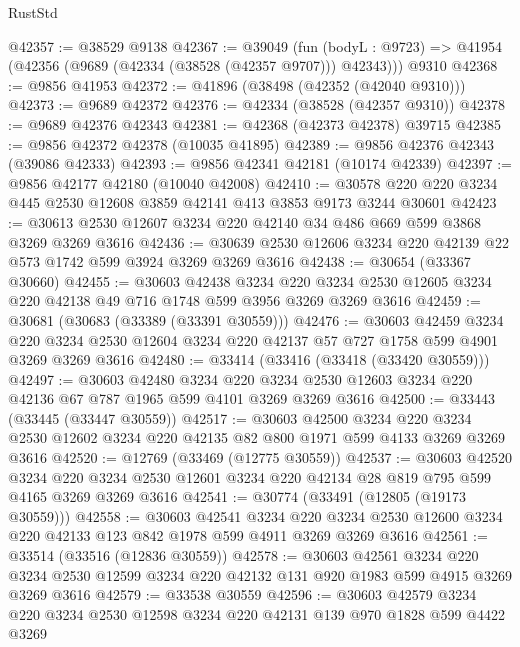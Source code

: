 \begin{lexlean}{RustStd}
\begin{coremodule}
@42357 := @38529 @9138
@42367 := @39049
    (fun (bodyL : @9723) => @41954 (@42356 (@9689 (@42334 (@38528 (@42357 @9707))) @42343)))
    @9310
@42368 := @9856 @41953
@42372 := @41896 (@38498 (@42352 (@42040 @9310)))
@42373 := @9689 @42372
@42376 := @42334 (@38528 (@42357 @9310))
@42378 := @9689 @42376 @42343
@42381 := @42368 (@42373 @42378) @39715
@42385 := @9856 @42372 @42378 (@10035 @41895)
@42389 := @9856 @42376 @42343 (@39086 @42333)
@42393 := @9856 @42341 @42181 (@10174 @42339)
@42397 := @9856 @42177 @42180 (@10040 @42008)
@42410 := @30578 @220 @220 @3234 @445 @2530 @12608 @3859 @42141 @413 @3853 @9173 @3244 @30601
@42423 := @30613 @2530 @12607 @3234 @220 @42140 @34 @486 @669 @599 @3868 @3269 @3269 @3616
@42436 := @30639 @2530 @12606 @3234 @220 @42139 @22 @573 @1742 @599 @3924 @3269 @3269 @3616
@42438 := @30654 (@33367 @30660)
@42455 := @30603
    @42438
    @3234
    @220
    @3234
    @2530
    @12605
    @3234
    @220
    @42138
    @49
    @716
    @1748
    @599
    @3956
    @3269
    @3269
    @3616
@42459 := @30681 (@30683 (@33389 (@33391 @30559)))
@42476 := @30603
    @42459
    @3234
    @220
    @3234
    @2530
    @12604
    @3234
    @220
    @42137
    @57
    @727
    @1758
    @599
    @4901
    @3269
    @3269
    @3616
@42480 := @33414 (@33416 (@33418 (@33420 @30559)))
@42497 := @30603
    @42480
    @3234
    @220
    @3234
    @2530
    @12603
    @3234
    @220
    @42136
    @67
    @787
    @1965
    @599
    @4101
    @3269
    @3269
    @3616
@42500 := @33443 (@33445 (@33447 @30559))
@42517 := @30603
    @42500
    @3234
    @220
    @3234
    @2530
    @12602
    @3234
    @220
    @42135
    @82
    @800
    @1971
    @599
    @4133
    @3269
    @3269
    @3616
@42520 := @12769 (@33469 (@12775 @30559))
@42537 := @30603
    @42520
    @3234
    @220
    @3234
    @2530
    @12601
    @3234
    @220
    @42134
    @28
    @819
    @795
    @599
    @4165
    @3269
    @3269
    @3616
@42541 := @30774 (@33491 (@12805 (@19173 @30559)))
@42558 := @30603
    @42541
    @3234
    @220
    @3234
    @2530
    @12600
    @3234
    @220
    @42133
    @123
    @842
    @1978
    @599
    @4911
    @3269
    @3269
    @3616
@42561 := @33514 (@33516 (@12836 @30559))
@42578 := @30603
    @42561
    @3234
    @220
    @3234
    @2530
    @12599
    @3234
    @220
    @42132
    @131
    @920
    @1983
    @599
    @4915
    @3269
    @3269
    @3616
@42579 := @33538 @30559
@42596 := @30603
    @42579
    @3234
    @220
    @3234
    @2530
    @12598
    @3234
    @220
    @42131
    @139
    @970
    @1828
    @599
    @4422
    @3269

\end{coremodule}
\end{lexlean}
